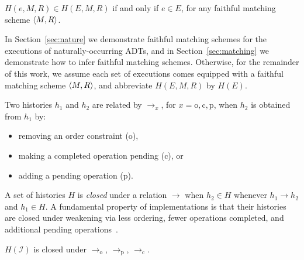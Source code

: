\begin{lemma}

  $H(e,M,R) \in H(E,M,R)$ if and only if $e \in E$, for any faithful matching
  scheme ${\left\langle{M,R}\right\rangle}$.

\end{lemma}

In Section~\ref{sec:nature} we demonstrate faithful matching schemes for the
executions of naturally-occurring ADTs, and in Section~\ref{sec:matching} we
demonstrate how to infer faithful matching schemes. Otherwise, for the
remainder of this work, we assume each set of executions comes equipped with a
faithful matching scheme ${\left\langle{M,R}\right\rangle}$, and abbreviate $H(E,M,R)$ by $H(E)$.

Two histories $h_1$ and $h_2$ are related by $\to_x$, for $x = \mathrm{o},
\mathrm{c}, \mathrm{p}$, when $h_2$ is obtained from $h_1$ by:
\begin{itemize}

  \item removing an order constraint (o),

  \item making a completed operation pending (c), or

  \item adding a pending operation (p).

\end{itemize}
A set of histories $H$ is \emph{closed} under a relation $\to$ when $h_2 \in H$
whenever $h_1 \to h_2$ and $h_1 \in H$. A fundamental property of
implementations is that their histories are closed under weakening via less
ordering, fewer operations completed, and additional pending
operations~\cite{conf/popl/BouajjaniEEH15}.

\begin{lemma}

  $H(\mathcal{I})$ is closed under $\to_\mathrm{o}$, $\to_\mathrm{p}$, 
  $\to_\mathrm{c}$.

\end{lemma}
